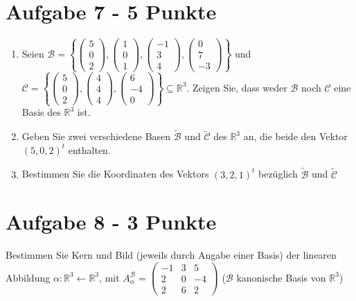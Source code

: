 \section*{Aufgabe 7 - 5 Punkte}
  \begin{enumerate}[label=\alph*)]
    \item Seien $\mathcal{B} = \left \lbrace
      \begin{pmatrix} 5\\0\\2\end{pmatrix},
      \begin{pmatrix} 1\\0\\1\end{pmatrix},
      \begin{pmatrix} -1\\3\\4\end{pmatrix},
      \begin{pmatrix} 0\\7\\-3\end{pmatrix}
      \right \rbrace$ und $\mathcal{C}= \left \lbrace
      \begin{pmatrix} 5\\0\\2\end{pmatrix},
      \begin{pmatrix} 4\\4\\4\end{pmatrix},
      \begin{pmatrix} 6\\-4\\0\end{pmatrix}
      \right \rbrace \subseteq \mathbb{R}^3$. Zeigen Sie, dass weder $\mathcal{B}$ noch $\mathcal{C}$ eine Basis des $\mathbb{R}^3$ ist.
          \item Geben Sie zwei verschiedene Basen  $\tilde{ \mathcal{B}}$ und  $\tilde{ \mathcal{C}}$ des $\mathbb{R}^3$ an, die beide den Vektor $(5,0,2)^t$ enthalten.
          \item Bestimmen Sie die Koordinaten des Vektors $(3,2,1)^t$ bezüglich
       $\tilde{ \mathcal{B}}$ und  $\tilde{ \mathcal{C}}$
  \end{enumerate}
\section*{Aufgabe 8 - 3 Punkte}
Bestimmen Sie Kern und Bild (jeweils durch Angabe einer Basis) der linearen Abbildung $\alpha : \mathbb{R}^3 \leftarrow \mathbb{R}^3$, mit
 $A_{\alpha}^{\mathcal{B}} = \begin{pmatrix} -1 &3&5\\2&0&-4\\2&6&2\end{pmatrix}$ ($\mathcal{B}$ kanonische Basis von $\mathbb{R}^3$)
